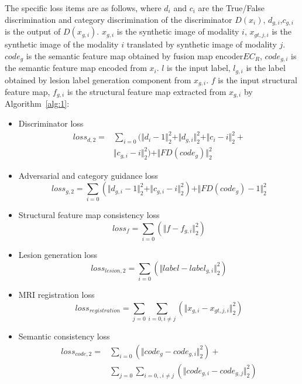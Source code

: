 \documentclass{ecai}
\begin{document}
The specific loss items are as follows, where $d_{i}$ and $c_{i}$ are the True/False discrimination and category discrimination of the discriminator $D(x_i)$, $d_{g, i}$,$c_{g,i}$ is the output of $D(x_{g,i})$. $x_{g,i}$ is the synthetic image of modality $i$, $x_{gt,j,i}$ is the synthetic image of the modality $i$ translated by synthetic image of modality $j$. $code_g$ is the semantic feature map obtained by fusion map encoder$EC_R$, $code_{g,i}$ is the semantic feature map encoded from $x_i$. $l$ is the input label, $l_{g,i}$ is the label obtained by lesion label generation component from $x_{g,i}$. $f$ is the input structural feature map, $f_{g,i}$ is the structural feature map extracted from $x_{g,i}$ by Algorithm~\ref{alg:1}:
\begin{itemize}
	\item{Discriminator loss }
	\begin{equation}
	\begin{split}
		loss_{d,2}=&\sum\limits_{i=0}(\Vert{d_{i}-1}\Vert_{2}^{2}+\Vert{d_{g,i}}\Vert_{2}^{2}+\Vert{c_{i}-i}\Vert_{2}^{2}+\\
		&\Vert{c_{g,i}-i}\Vert_{2}^{2})+\Vert{FD(code_{g})}\Vert_{2}^{2}
	\end{split}
	\end{equation}
	
	\item{Adversarial and category guidance loss}
	\begin{equation}
		loss_{g,2}=\sum\limits_{i=0}(\Vert{d_{g,i}-1}\Vert_{2}^{2}+\Vert{c_{g,i}-i}\Vert_{2}^{2})+\Vert{FD(code_{g})-1}\Vert_{2}^{2}
	\end{equation}
	
	\item{Structural feature map consistency loss}
	\begin{equation}
		loss_{f}=\sum\limits_{i=0}(\Vert{f-f_{g,i}}\Vert_{2}^{2})
	\end{equation}
	
	\item{Lesion generation loss}
	\begin{equation}
		loss_{lesion,2}=\sum\limits_{i=0}(\Vert{label-label_{g,i}}\Vert_{2}^{2})
	\end{equation}
	
	\item{MRI registration loss}
	\begin{equation}
		loss_{registration}=\sum\limits_{j=0}\sum\limits_{i=0,i\neq j}(\Vert{x_{g,i}-x_{gt,j,i}}\Vert_{2}^{2})
	\end{equation}
	
	\item{Semantic consistency loss}
	\begin{equation}
	\begin{split}
		loss_{code,2}=&\sum\limits_{i=0}(\Vert{code_g-code_{g,i}}\Vert_{2}^{2})+\\
		&\sum\limits_{j=0}\sum\limits_{i=0, ,i\neq j}(\Vert{code_{g,i}-code_{g,j}}\Vert_{2}^{2})
	\end{split}
	\end{equation}
	
\end{itemize}
\end{document}
